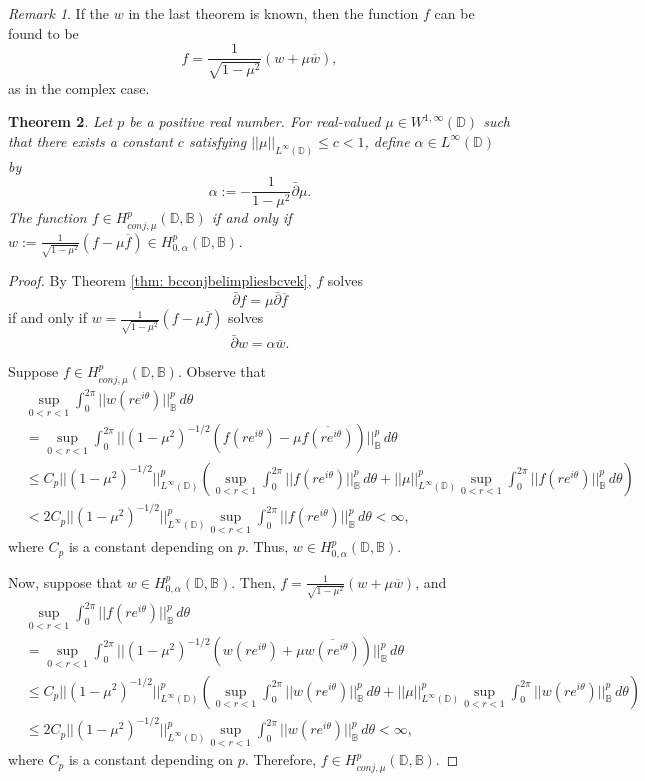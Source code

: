 \documentclass[12pt,reqno]{amsart}
\newtheorem{theorem}{Theorem}[section]
\theoremstyle{definition}
\theoremstyle{remark}
\newtheorem{comm}[theorem]{Remark}
\newcommand{\dbar}{\bar\partial}
\newcommand{\bc}{\mathbb{B}}
\newcommand{\disk}{\mathbb{D}}
\begin{document}
\begin{comm}
    If the $w$ in the last theorem is known, then the function $f$ can be found to be 
    \[
        f = \frac{1}{\sqrt{1-\mu^2}} (w + \mu\overline{w}),
    \]
    as in the complex case.
\end{comm}


\begin{theorem}
Let $p$ be a positive real number. For real-valued $\mu\in W^{1,\infty}(\disk)$ such that there exists a constant $c$ satisfying $||\mu||_{L^\infty(\disk)}\leq c < 1$, define $\alpha \in L^\infty(\disk)$ by
\[
    \alpha := - \frac{1}{1- \mu^2} \dbar \mu.
\]
The function $f \in H^p_{conj,\mu}(\disk,\bc)$ if and only if $w := \frac{1}{\sqrt{1-\mu^2}} (f - \mu \overline{f}) \in H^p_{0, \alpha}(\disk,\bc)$. 
\end{theorem}

\begin{proof}
By Theorem \ref{thm: bcconjbelimpliesbcvek}, $f$ solves
\[
        \dbar f = \mu \dbar \overline{f}
\]
if and only if $w = \frac{1}{\sqrt{1-\mu^2}} (f - \mu \overline{f})$ solves 
\[
        \dbar w = \alpha \overline{w}.
\]

Suppose $f \in H^p_{conj, \mu}(\disk,\bc)$. Observe that 
\begin{align*}
    &\sup_{0 < r < 1} \int_0^{2\pi} ||w(re^{i\theta})||_{\bc}^p \,d\theta \\
    &= \sup_{0 < r < 1} \int_0^{2\pi} ||(1-\mu^2)^{-1/2} (f(re^{i\theta}) - \mu \overline{f(re^{i\theta})})||_{\bc}^p \,d\theta \\
    &\leq C_p ||(1-\mu^2)^{-1/2}||^p_{L^\infty(\disk)} \left( \sup_{0 < r < 1} \int_0^{2\pi} ||f(re^{i\theta})||_{\bc}^p \,d\theta + ||\mu||^p_{L^\infty(\disk)} \sup_{0 < r < 1} \int_0^{2\pi} ||f(re^{i\theta})||_{\bc}^p \,d\theta\right)  \\
    &< 2 C_p ||(1-\mu^2)^{-1/2}||^p_{L^\infty(\disk)}  \sup_{0 < r < 1} \int_0^{2\pi} ||f(re^{i\theta})||_{\bc}^p \,d\theta< \infty,
\end{align*}
where $C_p$ is a constant depending on $p$. Thus, $w \in H^p_{0,\alpha}(\disk,\bc)$. 

Now, suppose that $w \in H^p_{0, \alpha}(\disk,\bc)$. Then, $f = \frac{1}{\sqrt{1-\mu^2}} (w + \mu\overline{w})$, and 
\begin{align*}
&\sup_{0 < r < 1} \int_0^{2\pi} ||f(re^{i\theta})||_{\bc}^p \,d\theta \\
    &= \sup_{0 < r < 1} \int_0^{2\pi} ||(1-\mu^2)^{-1/2} (w(re^{i\theta}) + \mu \overline{w(re^{i\theta})})||_{\bc}^p \,d\theta \\
    &\leq C_p||(1-\mu^2)^{-1/2}||^p_{L^\infty(\disk)} \left( \sup_{0 < r < 1} \int_0^{2\pi} ||w(re^{i\theta})||_{\bc}^p \,d\theta + ||\mu||^p_{L^\infty(\disk)} \sup_{0 < r < 1} \int_0^{2\pi} ||w(re^{i\theta})||_{\bc}^p \,d\theta\right)  \\
    &\leq 2C_p ||(1-\mu^2)^{-1/2}||^p_{L^\infty(\disk)}  \sup_{0 < r < 1} \int_0^{2\pi} ||w(re^{i\theta})||_{\bc}^p \,d\theta< \infty,
\end{align*}
where $C_p$ is a constant depending on $p$. Therefore, $f \in H^p_{conj, \mu}(\disk,\bc)$. 
\end{proof}
\end{document}
